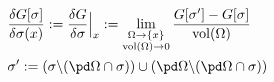 \begin{equation}	\label{12.9}
	\begin{split}
&
\frac{\delta G[\sigma]}{\delta\sigma(x)}
:=
\frac{\delta G}{\delta\sigma}\Big|_{x}
:=
\lim_{ \substack{\Omega\to\{x\} \\ \mathrm{vol}(\Omega)\to 0} }
\frac{G[\sigma'] - G[\sigma] } {\mathrm{vol}(\Omega)}
\\
&
\sigma':= (\sigma\backslash(\pd\Omega\cap\sigma))
  \cup (\pd\Omega\backslash(\pd\Omega\cap\sigma))
	\end{split}
	\end{equation}

